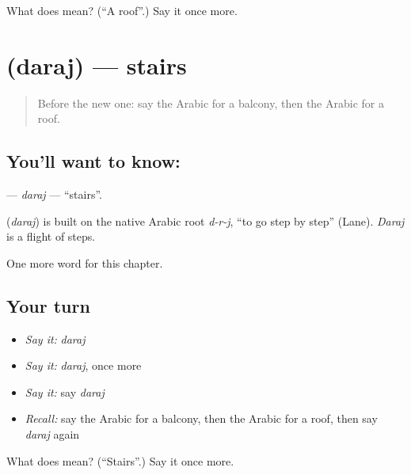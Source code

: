 \begin{tcolorbox}[breakable,colback=teal!4,colframe=teal!35!black,title={Before you move on}]
What does  mean? (\textquotedblleft{}A roof\textquotedblright{}.) Say it once more.
\end{tcolorbox}
\section[\texorpdfstring{\ar{درج} (daraj)}{درج (daraj)}]{ (daraj) — stairs}

\label{lesson:AR-C102-daraj}



\begin{quote}
Before the new one: say the Arabic for a balcony, then the Arabic for a roof.
\end{quote}

\subsection*{You'll want to know: }
\textbf{} — \emph{daraj} — \textquotedblleft{}stairs\textquotedblright{}.

\begin{cousinweb}
\textbf{} (\emph{daraj}) is built on the native Arabic root \emph{d-r-j}, \textquotedblleft{}to go step by step\textquotedblright{} (Lane). \emph{Daraj} is a flight of steps.
\end{cousinweb}

\begin{grammarlens}[title={What you've built}]
One more word for this chapter.
\end{grammarlens}

\subsection*{Your turn}
\begin{itemize}
\raggedright
  \item \emph{Say it:} \emph{daraj}
  \item \emph{Say it:} \emph{daraj}, once more
  \item \emph{Say it:} say \emph{daraj}
  \item \emph{Recall:} say the Arabic for a balcony, then the Arabic for a roof, then say \emph{daraj} again
\end{itemize}

\begin{tcolorbox}[breakable,colback=teal!4,colframe=teal!35!black,title={Before you move on}]
What does  mean? (\textquotedblleft{}Stairs\textquotedblright{}.) Say it once more.
\end{tcolorbox}
